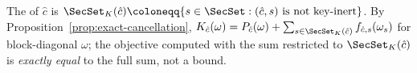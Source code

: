 
\begin{definition}\label{def:keyactive}
The
of $\hat c$ is
$\SecSet_{K}(\hat c)\coloneqq\{s\in\SecSet:(\hat c,s)\text{ is not
key-inert}\}$. By Proposition~\ref{prop:exact-cancellation},
$K_{\hat c}(\omega)=P_{\hat c}(\omega)
+\sum_{s\in\SecSet_{K}(\hat c)}f_{\hat c,s}(\omega_s)$ for block-diagonal
$\omega$; the objective computed with the sum restricted to
$\SecSet_K(\hat c)$ is \emph{exactly equal} to the full sum, not a bound.
\end{definition}
